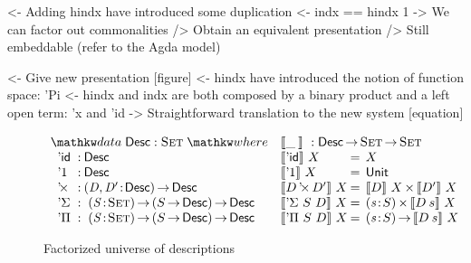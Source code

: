 \begin{structure}
<- Adding hindx have introduced some duplication
    <- indx == hindx 1
    -> We can factor out commonalities 
        /> Obtain an equivalent presentation
        /> Still embeddable (refer to the Agda model)
\end{structure}

\begin{structure}
<- Give new presentation [figure]
    <- hindx have introduced the notion of function space: 'Pi
    <- hindx and indx are both composed by a binary product and a left open term: 'x and 'id 
    -> Straightforward translation to the new system [equation]
\end{structure}

\begin{figure*}

\[
\begin{array}{ll}
\stk{
\data \Desc : \Set \where \\
\;\;\begin{array}{@{}l@{\::\:}l@{\quad}l}
    \DId            & \Desc                                   \\
    \DUnit          & \Desc                                   \\
    \DProd{}{}      & \PI{\V{D}, \V{D'}}{\Desc} \Desc         \\
    \DSigma         & \PI{\V{S}}{\Set} \PIS{S \To \Desc} \Desc \\
    \DPi            & \PI{\V{S}}{\Set} \PIS{S \To \Desc} \Desc 
\end{array}
}
&
\stk{
\descop{\_\:}{} : \Desc \To \Set \To \Set \\
\begin{array}{@{}l@{\:=\:\:}ll}
\descop{\DId}{X}          &  X                                           \\
\descop{\DUnit}{X}        &  \Unit                                       \\
\descop{\DProd{D}{D'}}{X} &  \TIMES{\descop{D}{X}}{\descop{D'}{X}}       \\
\descop{\DSigma{S}{D}}{X} &  \SIGMA{\V{s}}{S} \descop{D\: s}{X}                \\
\descop{\DPi{S}{D}}{X}    &  \PI{\V{s}}{S} \descop{D\: s}{X}            
\end{array}
}
\end{array}
\]

\caption{Factorized universe of descriptions}
\label{fig:factor_desc}

\end{figure*}


